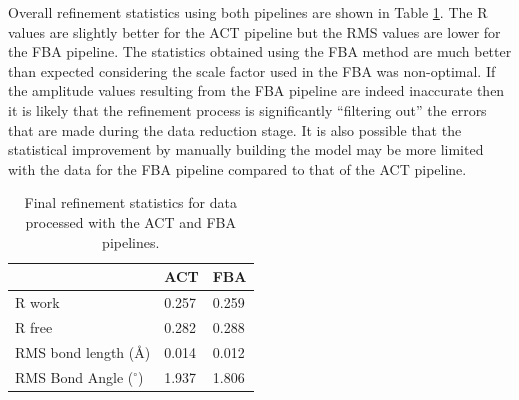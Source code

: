 Overall refinement statistics using both pipelines are shown in Table \ref{tab:Refinement statistics - C.Esp1396I}.
The R values are slightly better for the ACT pipeline but the RMS values are lower for the FBA pipeline.
The statistics obtained using the FBA method are much better than expected considering the scale factor used in the FBA was non-optimal.
If the amplitude values resulting from the FBA pipeline are indeed inaccurate then it is likely that the refinement process is significantly ``filtering out'' the errors that are made during the data reduction stage.
It is also possible that the statistical improvement by manually building the model may be more limited with the data for the FBA pipeline compared to that of the ACT pipeline.
\begin{table}[ht!]
	\caption[Final refinement statistics for data processed with the ACT and FBA pipelines.]{Final refinement statistics for data processed with the ACT and FBA pipelines.}
	\centering
	\begin{tabular}{p{4cm} | p{2.5cm} | p{2.5cm}}
		   & ACT & FBA  \\
		\hline
		R work                      & 0.257   & 0.259 \\
		R free                      & 0.282   & 0.288 \\
		RMS bond length (\AA)       & 0.014   & 0.012 \\
        RMS Bond Angle ($^{\circ}$) & 1.937   & 1.806 \\
		\hline
	\end{tabular}
	\label{tab:Refinement statistics - C.Esp1396I}
\end{table}
